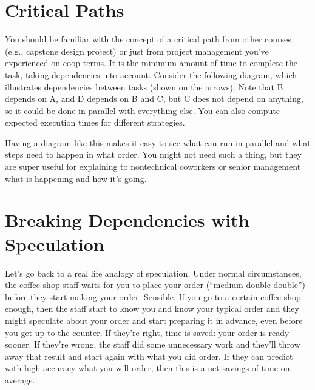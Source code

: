 \documentclass[a4paper]{report}
\begin{document}
\section*{Critical Paths}
You should be familiar with the concept of a critical path from other courses (e.g., capstone design project) or just from project management you've experienced on coop terms. 
It is the minimum amount of time to complete the task, taking dependencies into account.
Consider the following diagram, which illustrates dependencies between
tasks (shown on the arrows). 
Note that B depends on A, and D depends on B and C, but C does
not depend on anything, so it could be done in parallel with
everything else. You can also compute expected execution times
for different strategies.
\begin{center}
\end{center}

 Having a diagram like this makes it easy to see what can run in parallel and what steps need to happen in what order.  You might not need such a thing, but they are super useful for explaining to nontechnical coworkers or senior management what is happening and how it's going.


\section*{Breaking Dependencies with Speculation}
Let's go back to a real life analogy of speculation. Under normal circumstances, the coffee shop staff waits for you to place your order (``medium double double'') before they start making your order. Sensible. If you go to a certain coffee shop enough, then the staff start to know you and know your typical order and they might speculate about your order and start preparing it in advance, even before you get up to the counter. If they're right, time is saved: your order is ready sooner. If they're wrong, the staff did some unnecessary work and they'll throw away that result and start again with what you did order. If they can predict with high accuracy what you will order, then this is a net savings of time on average.
\end{document}

